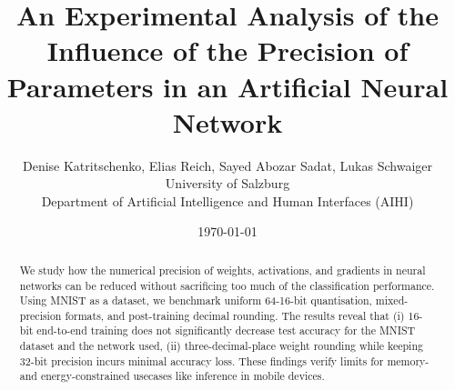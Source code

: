 \documentclass[11pt]{article}
\title{An Experimental Analysis of the Influence of the Precision of Parameters in an Artificial Neural Network}
\author{Denise Katritschenko, Elias Reich, Sayed Abozar Sadat, Lukas Schwaiger\\
	\small University of Salzburg\\
	\small Department of Artificial Intelligence and Human Interfaces (AIHI) }
\date{\today}
\begin{document}
\maketitle

\begin{abstract}
	We study how the numerical precision of weights, activations, and gradients in neural
	networks can be reduced without sacrificing too much of the classification
	performance. Using MNIST as a dataset, we benchmark uniform 64-16-bit quantisation,
	mixed-precision formats, and post-training decimal rounding. The results reveal that
	(i) 16-bit end-to-end training does not significantly decrease test accuracy for the
	MNIST dataset and the network used, (ii) three-decimal-place weight rounding while
	keeping 32-bit precision incurs minimal accuracy loss. These findings verify limits
	for memory- and energy-constrained usecases like inference in mobile devices.
\end{abstract}
\end{document}
